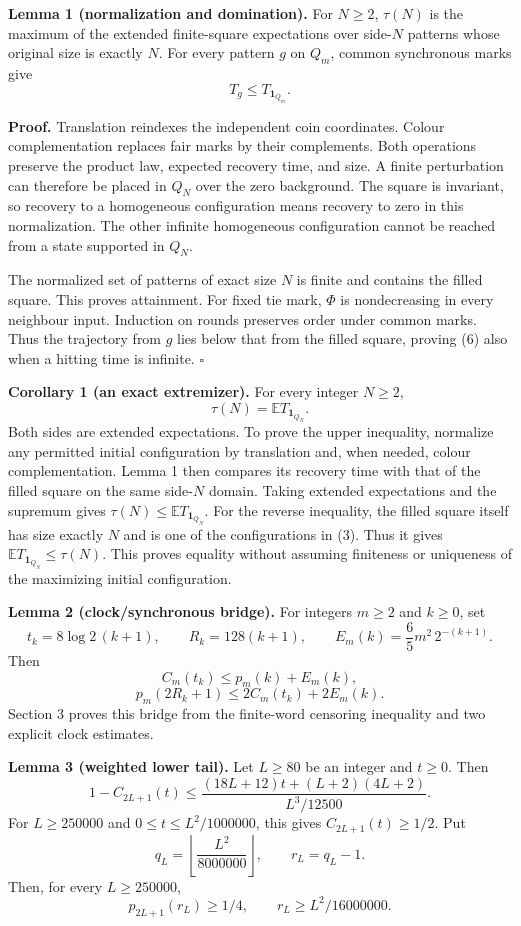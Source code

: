 \documentclass[
  11pt,
  a4paper,
]{article}
\begin{document}
\textbf{Lemma 1 (normalization and domination).} For \(N\geq2\),
\(\tau(N)\) is the maximum of the extended finite-square expectations
over side-\(N\) patterns whose original size is exactly \(N\). For every
pattern \(g\) on \(Q_m\), common synchronous marks give \[
T_g\leq T_{\mathbf1_{Q_m}}.
\tag{6}
\]

\textbf{Proof.} Translation reindexes the independent coin coordinates.
Colour complementation replaces fair marks by their complements. Both
operations preserve the product law, expected recovery time, and size. A
finite perturbation can therefore be placed in \(Q_N\) over the zero
background. The square is invariant, so recovery to a homogeneous
configuration means recovery to zero in this normalization. The other
infinite homogeneous configuration cannot be reached from a state
supported in \(Q_N\).

The normalized set of patterns of exact size \(N\) is finite and
contains the filled square. This proves attainment. For fixed tie mark,
\(\Phi\) is nondecreasing in every neighbour input. Induction on rounds
preserves order under common marks. Thus the trajectory from \(g\) lies
below that from the filled square, proving (6) also when a hitting time
is infinite. \(\square\)

\textbf{Corollary 1 (an exact extremizer).} For every integer
\(N\geq2\), \[
\tau(N)=\mathbb E T_{\mathbf1_{Q_N}}.
\tag{6a}
\] Both sides are extended expectations. To prove the upper inequality,
normalize any permitted initial configuration by translation and, when
needed, colour complementation. Lemma 1 then compares its recovery time
with that of the filled square on the same side-\(N\) domain. Taking
extended expectations and the supremum gives
\(\tau(N)\leq\mathbb E T_{\mathbf1_{Q_N}}\). For the reverse inequality,
the filled square itself has size exactly \(N\) and is one of the
configurations in (3). Thus it gives
\(\mathbb E T_{\mathbf1_{Q_N}}\leq\tau(N)\). This proves equality
without assuming finiteness or uniqueness of the maximizing initial
configuration.

\textbf{Lemma 2 (clock/synchronous bridge).} For integers \(m\geq2\) and
\(k\geq0\), set \[
t_k=8\log2\,(k+1),\qquad R_k=128(k+1),\qquad
E_m(k)=\frac65m^2\,2^{-(k+1)}.
\tag{7}
\] Then \[
C_m(t_k)\leq p_m(k)+E_m(k),
\tag{8}
\] \[
p_m(2R_k+1)\leq2C_m(t_k)+2E_m(k).
\tag{9}
\] Section 3 proves this bridge from the finite-word censoring
inequality and two explicit clock estimates.

\textbf{Lemma 3 (weighted lower tail).} Let \(L\geq80\) be an integer
and \(t\geq0\). Then \[
1-C_{2L+1}(t)\leq
\frac{(18L+12)t+(L+2)(4L+2)}{L^3/12500}.
\tag{10}
\] For \(L\geq250000\) and \(0\leq t\leq L^2/1000000\), this gives
\(C_{2L+1}(t)\geq1/2\). Put \[
q_L=\left\lfloor\frac{L^2}{8000000}\right\rfloor,
\qquad r_L=q_L-1.
\tag{11}
\] Then, for every \(L\geq250000\), \[
p_{2L+1}(r_L)\geq1/4,\qquad
r_L\geq L^2/16000000.
\tag{12}
\]
\end{document}
